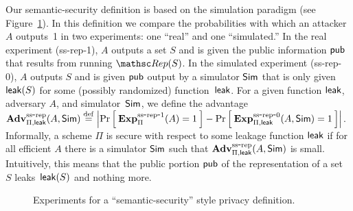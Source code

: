 Our semantic-security definition is based on the simulation paradigm (see Figure~\ref{fig:privacy-ss}).
In this definition we compare the probabilities with which an attacker $A$ outputs~1
in two experiments: one ``real'' and one ``simulated.''
In the real experiment (ss-rep-1), $A$ outputs a set $S$  and is given the
public information ${\sf pub}$ that results from running $\Rep(S)$.
In the simulated experiment (ss-rep-0), $A$ outputs $S$ and is given ${\sf pub}$ output
by a simulator ${\sf Sim}$ that is only given ${\sf leak}(S)$ for some (possibly randomized)
function~${\sf leak}$.
For a given function ${\sf leak}$, adversary $A$, and simulator~${\sf Sim}$,
we define the advantage
$\mathrm{\mathbf{Adv}}^{\mathrm{ss\mbox{-}rep}}_{\Pi,{\sf leak}}(A,{\sf Sim}) \stackrel{\rm def}{=}
\left| \Pr\left[\: \mathrm{\mathbf{Exp}}^{\mathrm{ss\mbox{-}rep\mbox{-}1}}_{\Pi}(A)=1 \:\right] -
\Pr\left[\: \mathrm{\mathbf{Exp}}^{\mathrm{ss\mbox{-}rep\mbox{-}0}}_{\Pi,{\sf leak}}(A, {\sf Sim})=1 \:\right] \right|$.
Informally, a scheme $\Pi$ is secure with respect to some leakage function ${\sf leak}$
if for all efficient $A$ there is a simulator ${\sf Sim}$ such that
$\mathrm{\mathbf{Adv}}^{\mathrm{ss\mbox{-}rep}}_{\Pi,{\sf leak}}(A,{\sf Sim})$ is small. 
Intuitively, this means that the public portion
${\sf pub}$ of the representation of a set~$S$ leaks~${\sf leak}(S)$ and nothing more.

\begin{figure}[hbtp]
\centering
{}
\caption{Experiments for a ``semantic-security'' style privacy
  definition.}
\label{fig:privacy-ss}
\end{figure}


